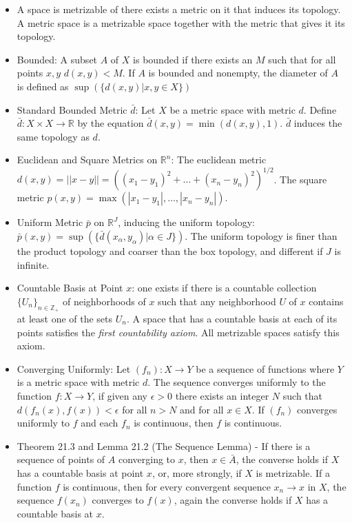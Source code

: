 \documentclass[12pt,letterpaper]{article}
\begin{document}
\begin{enumerate}
\begin{itemize}
    \item A space is metrizable of there exists a metric on it that induces its topology. A metric space is a metrizable space together with the metric that gives it its topology.
    \item Bounded: A subset $A$ of $X$ is bounded if there exists an $M$ such that for all points $x,y$ $d(x,y)<M$. If $A$ is bounded and nonempty, the diameter of $A$ is defined as $\sup( \{d(x,y) | x,y\in X\})$
    \item Standard Bounded Metric $\bar{d}$: Let $X$ be a metric space with metric $d$. Define $\bar{d}: X\times X \rightarrow \mathbb{R}$ by the equation $\bar{d}(x,y) = \min(d(x,y),1)$. $\bar{d}$ induces the same topology as $d$.
    \item Euclidean and Square Metrics on $\mathbb{R}^n$: The euclidean metric $d(x,y) = ||x-y|| = ((x_1 - y_1)^2 + \dots + (x_n - y_n)^2)^{1/2}$. The square metric $p(x,y) = \max(|x_1 - y_1|, \dots , |x_n - y_n|)$.
    \item Uniform Metric $\bar{p}$ on $\mathbb{R}^J$, inducing the uniform topology: $\bar{p}(x,y) = \sup(\{\bar{d}(x_\alpha, y_\alpha) | \alpha \in J\})$. The uniform topology is finer than the product topology and coarser than the box topology, and different if $J$ is infinite.
    \item \label{dfn:countableBasis} Countable Basis at Point $x$: one exists if there is a countable collection $\{U_n\}_{n\in\mathbb{Z}_+}$ of neighborhoods of $x$ such that any neighborhood $U$ of $x$ contains at least one of the sets $U_n$. A space that has a countable basis at each of its points satisfies the \emph{first countability axiom}. All metrizable spaces satisfy this axiom.
    \item \label{dfn:convergesUniformly} Converging Uniformly: Let $(f_n): X\rightarrow Y$ be a sequence of functions where $Y$ is a metric space with metric $d$. The sequence converges uniformly to the function $f:X\rightarrow Y$, if given any $\epsilon>0$ there exists an integer $N$ such that $d(f_n(x), f(x))<\epsilon$ for all $n>N$ and for all $x\in X$.  If $(f_n)$ converges uniformly to $f$ and each $f_n$ is continuous, then $f$ is continuous.
    \item \label{thm:SequenceContinuity21.3} Theorem 21.3 and Lemma 21.2 (The Sequence Lemma) - If there is a sequence of points of $A$ converging to $x$, then $x\in \bar{A}$, the converse holds if $X$ has a countable basis at point $x$, or, more strongly, if $X$ is metrizable. If a function $f$ is continuous, then for every convergent sequence $x_n\rightarrow x$ in $X$, the sequence $f(x_n)$ converges to $f(x)$, again the converse holds if $X$ has a countable basis at $x$. 

\end{itemize}
\end{enumerate}
\end{document}
